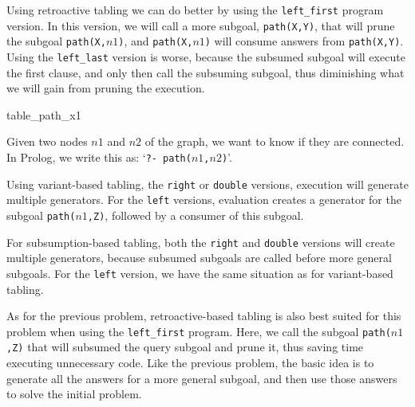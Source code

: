\begin{description}
   Using retroactive tabling we can do better by using the \texttt{left\_first} program version.
   In this version, we will call a more subgoal, \texttt{path(X,Y)}, that will prune the subgoal
   \texttt{path(X,$n1$)}, and \texttt{path(X,$n1$)} will consume answers from \texttt{path(X,Y)}.
   Using the \texttt{left\_last} version is worse, because the subsumed subgoal will execute the first
   clause, and only then call the subsuming subgoal, thus diminishing what we will gain from pruning
   the execution.
   
   \item{table_path_x1}
   
   \item[if two nodes are connected:] Given two nodes $n1$ and $n2$ of the graph, we want to know if
   they are connected. In Prolog, we write this as: `\texttt{?-~path($n1$,$n2$)}'.
   
   Using variant-based tabling, the \texttt{right} or \texttt{double} versions, execution will generate multiple
   generators. For the \texttt{left} versions, evaluation creates a generator for the subgoal
   \texttt{path($n1$,Z)}, followed by a consumer of this subgoal.
   
   For subsumption-based tabling, both the \texttt{right} and \texttt{double} versions will create multiple
   generators, because subsumed subgoals are called before more general subgoals. For the \texttt{left} version,
   we have the same situation as for variant-based tabling.
   
   As for the previous problem, retroactive-based tabling is also best suited for this problem when using the
   \texttt{left\_first} program. Here, we call the subgoal \texttt{path($n1$,Z)} that will subsumed the query
   subgoal and prune it, thus saving time executing unnecessary code. Like the previous problem,
   the basic idea is to generate all the answers for a more general subgoal, and then use those answers to solve
   the initial problem. 
\end{description}